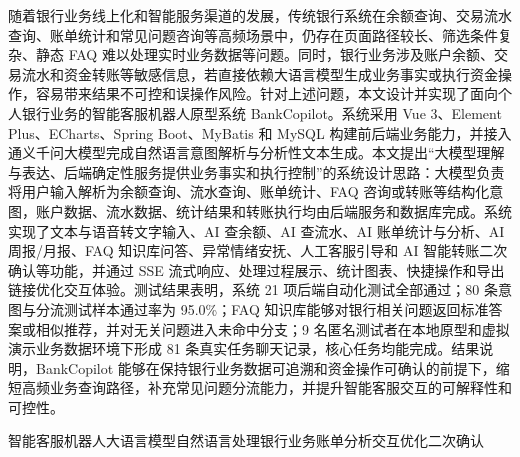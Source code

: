 \documentclass[bachelor, print]{xduthesis}
\begin{document}
\frontmatter


\begin{cabstract}
随着银行业务线上化和智能服务渠道的发展，传统银行系统在余额查询、交易流水查询、账单统计和常见问题咨询等高频场景中，仍存在页面路径较长、筛选条件复杂、静态 FAQ 难以处理实时业务数据等问题。同时，银行业务涉及账户余额、交易流水和资金转账等敏感信息，若直接依赖大语言模型生成业务事实或执行资金操作，容易带来结果不可控和误操作风险。针对上述问题，本文设计并实现了面向个人银行业务的智能客服机器人原型系统 BankCopilot。系统采用 Vue 3、Element Plus、ECharts、Spring Boot、MyBatis 和 MySQL 构建前后端业务能力，并接入通义千问大模型完成自然语言意图解析与分析性文本生成。本文提出“大模型理解与表达、后端确定性服务提供业务事实和执行控制”的系统设计思路：大模型负责将用户输入解析为余额查询、流水查询、账单统计、FAQ 咨询或转账等结构化意图，账户数据、流水数据、统计结果和转账执行均由后端服务和数据库完成。系统实现了文本与语音转文字输入、AI 查余额、AI 查流水、AI 账单统计与分析、AI 周报/月报、FAQ 知识库问答、异常情绪安抚、人工客服引导和 AI 智能转账二次确认等功能，并通过 SSE 流式响应、处理过程展示、统计图表、快捷操作和导出链接优化交互体验。测试结果表明，系统 21 项后端自动化测试全部通过；80 条意图与分流测试样本通过率为 95.0\%；FAQ 知识库能够对银行相关问题返回标准答案或相似推荐，并对无关问题进入未命中分支；9 名匿名测试者在本地原型和虚拟演示业务数据环境下形成 81 条真实任务聊天记录，核心任务均能完成。结果说明，BankCopilot 能够在保持银行业务数据可追溯和资金操作可确认的前提下，缩短高频业务查询路径，补充常见问题分流能力，并提升智能客服交互的可解释性和可控性。
\end{cabstract}

\begin{ckeywords}
智能客服机器人\quad 大语言模型\quad 自然语言处理\quad 银行业务\quad 账单分析\quad 交互优化\quad 二次确认
\end{ckeywords}
\end{document}

